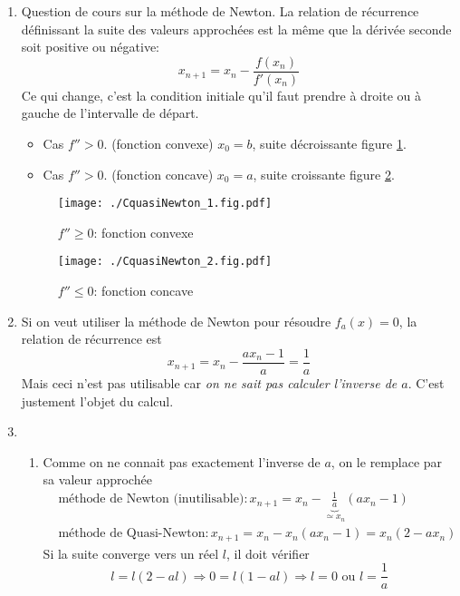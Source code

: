 \begin{enumerate}
  \item Question de cours sur la méthode de Newton.\newline
  La relation de récurrence définissant la suite des valeurs approchées est la même que la dérivée seconde soit positive ou négative:
\begin{displaymath}
  x_{n+1} = x_n - \frac{f(x_n)}{f'(x_n)}
\end{displaymath}
Ce qui change, c'est la condition initiale qu'il faut prendre à droite ou à gauche de l'intervalle de départ.
\begin{itemize}
  \item Cas $f''>0$. (fonction convexe) $x_0 = b$, suite décroissante figure \ref{fig: CquasiNewton_1}.
  \item Cas $f''>0$. (fonction concave) $x_0 = a$, suite croissante figure \ref{fig: CquasiNewton_2}.
\end{itemize}

\begin{figure}[h]
  \centering
  \texttt{[image: ./CquasiNewton\_1.fig.pdf]}
  \caption{$f''\geq 0$: fonction convexe}
  \label{fig: CquasiNewton_1}
\end{figure}
\begin{figure}[h]
  \centering
  \texttt{[image: ./CquasiNewton\_2.fig.pdf]}
  \caption{$f''\leq 0$: fonction concave}
  \label{fig: CquasiNewton_2}
\end{figure}

  \item Si on veut utiliser la méthode de Newton pour résoudre $f_a(x) = 0$, la relation de récurrence est 
\begin{displaymath}
  x_{n+1} = x_n - \frac{ax_n -1}{ a} = \frac{1}{a}
\end{displaymath}
Mais ceci n'est pas utilisable car \emph{on ne sait pas calculer l'inverse de $a$}. C'est justement l'objet du calcul. 

  \item
\begin{enumerate}
  \item Comme on ne connait pas exactement l'inverse de $a$, on le remplace par sa valeur approchée 
\begin{align*}
  &\text{méthode de Newton (inutilisable)}: x_{n+1} = x_n - \underset{\simeq x_n}{\underbrace{\frac{1}{ a}}}(ax_n -1) \\
  &\text{méthode de Quasi-Newton}: x_{n+1} = x_n-x_n(ax_n - 1) = x_n(2-ax_n)
\end{align*}
Si la suite converge vers un réel $l$, il doit vérifier
\begin{displaymath}
  l=l(2-al) \Rightarrow 0 = l(1-al) \Rightarrow l =0 \text{ ou } l=\frac{1}{a}
\end{displaymath}


\end{enumerate}
\end{enumerate}
